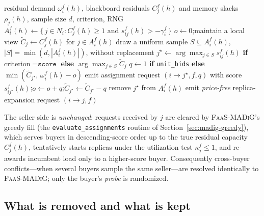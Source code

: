 \begin{algorithm}
\caption{\textsc{FaaS-MAPoD} --- buyer power-of-$d$ sampling (replaces the FaaS-MADiG buyer rule)}
\label{alg:mapod-buyer}
\begin{algorithmic}[1]
\Require residual demand $\omega_i^f(h)$, blackboard residuals $C_j^f(h)$ and memory slacks $\rho_j(h)$, sample size $d$, criterion, RNG
  \State $A_i^f(h)\gets\{\,j\in N_i: C_j^f(h)\ge 1 \text{ and } s_{ij}^f(h)>-\gamma_i^f\,\}$
  \State $o\gets 0$;\quad maintain a local view $\tilde C_j\gets C_j^f(h)$ for $j\in A_i^f(h)$
     \State draw a uniform sample $S\subseteq A_i^f(h)$, $|S|=\min(d,|A_i^f(h)|)$, without replacement
     \State $j^\star\gets\arg\max_{j\in S} s_{ij}^f(h)$ \textbf{if} criterion${}=\texttt{score}$ \textbf{else} $\arg\max_{j\in S}\tilde C_j$ 
     \State $q\gets 1$ \textbf{if} \texttt{unit\_bids} \textbf{else} $\min(\tilde C_{j^\star},\,\omega_i^f(h)-o)$
     \State emit assignment request $(i\!\to\! j^\star,f,q)$ with score $s_{ij^\star}^f(h)$;\quad $o\gets o+q$;\quad $\tilde C_{j^\star}\gets\tilde C_{j^\star}-q$
      remove $j^\star$ from $A_i^f(h)$ \EndIf
  \EndWhile
      
        \State emit \emph{price-free} replica-expansion request $(i\!\to\! j,f)$
     \EndFor
  \EndIf
\EndFor
\end{algorithmic}
\end{algorithm}

The seller side is \emph{unchanged}: requests received by $j$ are cleared by
\textsc{FaaS-MADiG}'s greedy fill (the \texttt{evaluate\_assignments} routine of
Section~\ref{sec:madig-greedy}), which serves buyers in descending-score order
up to the true residual capacity $C_j^f(h)$, tentatively starts replicas under
the utilization test $\kappa_j^f\le 1$, and re-awards incumbent load only to a
higher-score buyer. Consequently cross-buyer conflicts---when several buyers
sample the same seller---are resolved identically to \textsc{FaaS-MADiG}; only
the buyer's \emph{probe} is randomized.

\subsection{What is removed and what is kept}
\label{sec:mapod-ablation}

